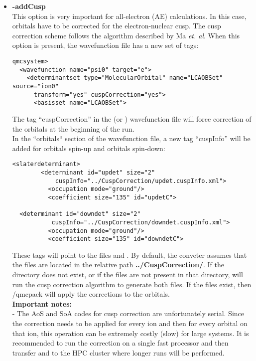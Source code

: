 \begin{itemize}
\begin{itemize}
\end{itemize}


\item \textbf{-addCusp} \\ This option is very important for
  all-electron (AE) calculations. In this case, orbitals have to be
  corrected for the electron-nuclear cusp. The cusp correction scheme
  follows the algorithm described by Ma \textit{et. al}. \cite{Ma2005}
  When this option is present, the wavefunction file has a new set of
  tags:

\begin{lstlisting}[style=QMCPXML]
 qmcsystem>
  <wavefunction name="psi0" target="e">
    <determinantset type="MolecularOrbital" name="LCAOBSet" source="ion0"
      transform="yes" cuspCorrection="yes">
      <basisset name="LCAOBSet">
\end{lstlisting}

The tag ``cuspCorrection'' in the  (or ) wavefunction file will force correction of the orbitals at the beginning of the \qmcpack run. \\
In the ``orbitals`` section of the wavefunction file, a new tag ``cuspInfo'' will be added for orbitals spin-up and orbitals spin-down:

\begin{lstlisting}[style=QMCPXML]
   <slaterdeterminant>
        <determinant id="updet" size="2"
            cuspInfo="../CuspCorrection/updet.cuspInfo.xml">
          <occupation mode="ground"/>
          <coefficient size="135" id="updetC">
          
  <determinant id="downdet" size="2"
           cuspInfo="../CuspCorrection/downdet.cuspInfo.xml">
          <occupation mode="ground"/>
          <coefficient size="135" id="downdetC">
\end{lstlisting}

These tags will point to the files  and
. By default, the conveter assumes that
the files are located in the relative path
\textbf{../CuspCorrection/}. If the directory
 does not exist, or if the files are not
present in that directory, \qmcpack will run the cusp correction
algorithm to generate both files.  If the files exist, then /qmcpack
will apply the corrections to the orbitals. \\

\textbf{Important notes:}\\
- The AoS and SoA codes for cusp correction are unfortunately serial. Since the correction needs to be applied for every ion and then for every orbital on that ion, this operation can be extremely costly (slow) for large systems. It is recommended to run the correction on a single fast processor and then transfer  and  to the HPC cluster where longer runs will be performed. \\


\end{itemize}
